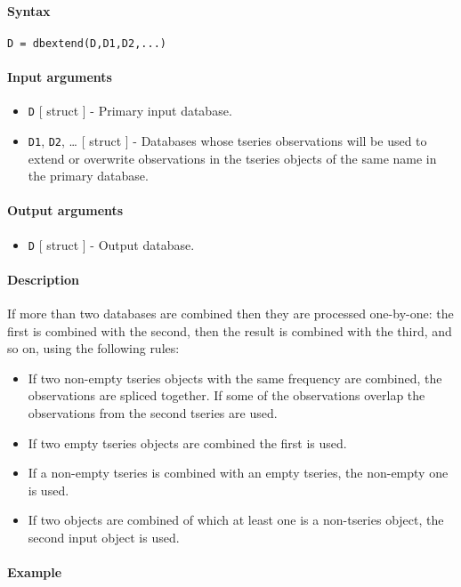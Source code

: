 


	\paragraph{Syntax}

\begin{verbatim}
D = dbextend(D,D1,D2,...)
\end{verbatim}

\paragraph{Input arguments}

\begin{itemize}
\item
  \texttt{D} {[} struct {]} - Primary input database.
\item
  \texttt{D1}, \texttt{D2}, \ldots{} {[} struct {]} - Databases whose
  tseries observations will be used to extend or overwrite observations
  in the tseries objects of the same name in the primary database.
\end{itemize}

\paragraph{Output arguments}

\begin{itemize}
\itemsep1pt\parskip0pt
\item
  \texttt{D} {[} struct {]} - Output database.
\end{itemize}

\paragraph{Description}

If more than two databases are combined then they are processed
one-by-one: the first is combined with the second, then the result is
combined with the third, and so on, using the following rules:

\begin{itemize}
\itemsep1pt\parskip0pt
\item
  If two non-empty tseries objects with the same frequency are combined,
  the observations are spliced together. If some of the observations
  overlap the observations from the second tseries are used.
\item
  If two empty tseries objects are combined the first is used.
\item
  If a non-empty tseries is combined with an empty tseries, the
  non-empty one is used.
\item
  If two objects are combined of which at least one is a non-tseries
  object, the second input object is used.
\end{itemize}

\paragraph{Example}


